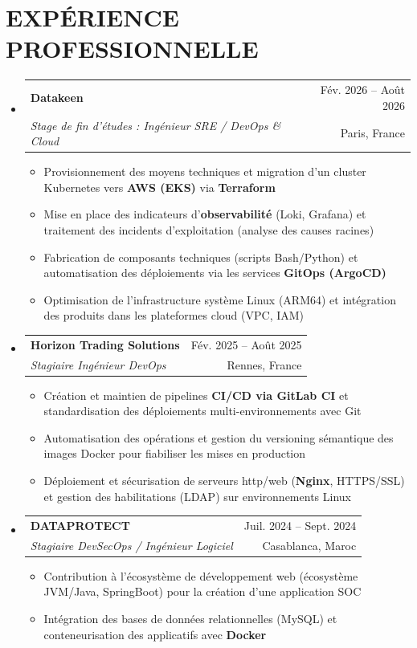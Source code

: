 \documentclass[letterpaper,10pt]{article}
\makeatletter
\newcommand{\resumeItem}[1]{
  \item\small{
    {#1 \vspace{-3pt}}
  }
}
\newcommand{\resumeSubheading}[4]{
  \vspace{-1pt}\item
    \begin{tabular*}{\textwidth}[t]{l@{\extracolsep{\fill}}r}
      \textbf{#1} & {\color{dark-grey}\small #2}\vspace{1pt}\\
       \textit{#3} & {\color{dark-grey} \small #4}\\
     \end{tabular*}\vspace{-6pt}
}
\newcommand{\resumeSubHeadingListStart}{\begin{itemize}[leftmargin=0in, label={}]}
\newcommand{\resumeSubHeadingListEnd}{\end{itemize}}
\newcommand{\resumeItemListStart}{\begin{itemize}}
\newcommand{\resumeItemListEnd}{\end{itemize}\vspace{0pt}}
\makeatother
\begin{document}
\section{EXPÉRIENCE PROFESSIONNELLE}
  \resumeSubHeadingListStart
     \resumeSubheading
      {Datakeen}{Fév. 2026 -- Août 2026}
      {Stage de fin d'études : Ingénieur SRE / DevOps \& Cloud}{Paris, France}
      \resumeItemListStart
        \resumeItem{Provisionnement des moyens techniques et migration d'un cluster Kubernetes vers \textbf{AWS (EKS)} via \textbf{Terraform}}
        \resumeItem{Mise en place des indicateurs d'\textbf{observabilité} (Loki, Grafana) et traitement des incidents d'exploitation (analyse des causes racines)}
        \resumeItem{Fabrication de composants techniques (scripts Bash/Python) et automatisation des déploiements via les services \textbf{GitOps (ArgoCD)}}
        \resumeItem{Optimisation de l'infrastructure système Linux (ARM64) et intégration des produits dans les plateformes cloud (VPC, IAM)}
      \resumeItemListEnd
     \resumeSubheading
      {Horizon Trading Solutions}{Fév. 2025 -- Août 2025}
      {Stagiaire Ingénieur DevOps}{Rennes, France}
      \resumeItemListStart
        \resumeItem{Création et maintien de pipelines \textbf{CI/CD via GitLab CI} et standardisation des déploiements multi-environnements avec Git}
        \resumeItem{Automatisation des opérations et gestion du versioning sémantique des images Docker pour fiabiliser les mises en production}
        \resumeItem{Déploiement et sécurisation de serveurs http/web (\textbf{Nginx}, HTTPS/SSL) et gestion des habilitations (LDAP) sur environnements Linux}
      \resumeItemListEnd
     \resumeSubheading
      {DATAPROTECT}{Juil. 2024 -- Sept. 2024}
      {Stagiaire DevSecOps / Ingénieur Logiciel}{Casablanca, Maroc}
      \resumeItemListStart
        \resumeItem{Contribution à l'écosystème de développement web (écosystème JVM/Java, SpringBoot) pour la création d'une application SOC}
        \resumeItem{Intégration des bases de données relationnelles (MySQL) et conteneurisation des applicatifs avec \textbf{Docker}}
      \resumeItemListEnd
   \resumeSubHeadingListEnd

\end{document}
